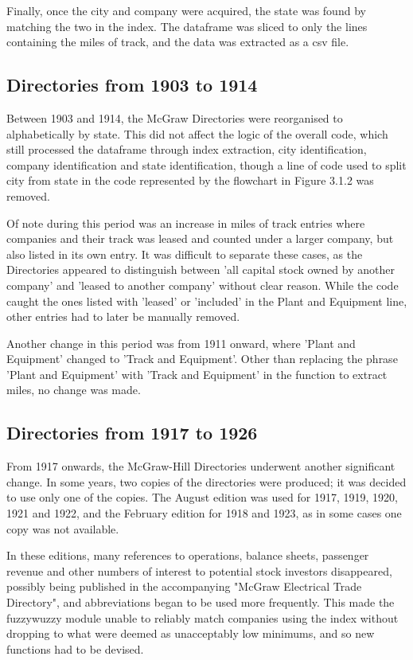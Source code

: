 Finally, once the city and company were acquired, the state was found by matching the two in the index. The dataframe was sliced to only the lines containing the miles of track, and the data was extracted as a csv file. 

\subsection{Directories from 1903 to 1914}
Between 1903 and 1914, the McGraw Directories were reorganised to alphabetically by state. This did not affect the logic of the overall code, which still processed the dataframe through index extraction, city identification, company identification and state identification, though a line of code used to split city from state in the code represented by the flowchart in Figure 3.1.2 was removed.

Of note during this period was an increase in miles of track entries where companies and their track was leased and counted under a larger company, but also listed in its own entry. It was difficult to separate these cases, as the Directories appeared to distinguish between 'all capital stock owned by another company' and 'leased to another company' without clear reason. While the code caught the ones listed with 'leased' or 'included' in the Plant and Equipment line, other entries had to later be manually removed.

Another change in this period was from 1911 onward, where 'Plant and Equipment' changed to 'Track and Equipment'. Other than replacing the phrase 'Plant and Equipment' with 'Track and Equipment' in the function to extract miles, no change was made. 

\subsection{Directories from 1917 to 1926}

From 1917 onwards, the McGraw-Hill Directories underwent another significant change. In some years, two copies of the directories were produced; it was decided to use only one of the copies. The August edition was used for 1917, 1919, 1920, 1921 and 1922, and the February edition for 1918 and 1923, as in some cases one copy was not available. 

In these editions, many references to operations, balance sheets, passenger revenue and other numbers of interest to potential stock investors disappeared, possibly being published in the accompanying "McGraw Electrical Trade Directory", and abbreviations began to be used more frequently. This made the fuzzywuzzy module unable to reliably match companies using the index without dropping to what were deemed as unacceptably low minimums, and so new functions had to be devised.

